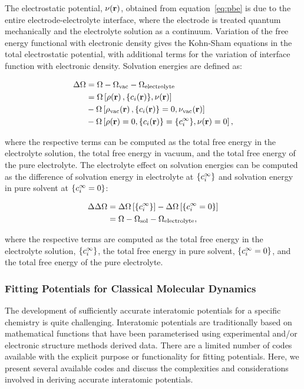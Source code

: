\documentclass[../main.tex]{subfiles}
\begin{document}
The electrostatic potential, $\nu\!\left(\mathbf{r}\right)$, obtained from equation~\ref{eq:pbe} is due to the entire electrode-electrolyte interface, where the electrode is treated quantum mechanically and the electrolyte solution as a continuum. Variation of the free energy functional with electronic density gives the Kohn-Sham equations in the total electrostatic potential, with additional terms for the variation of interface function with electronic density.\cite{Dziedzic2011, Ringe2016} Solvation energies are defined as:\cite{Ringe2016, Stein2019}

\begin{align}
    \Delta\Omega &=\Omega-\Omega_{\textrm{vac}}-\Omega_{\textrm{electrolyte}} \\
    &=\Omega\left[\rho\ofrvec,\{\ci\ofrvec\},\nu\ofrvec\right] \\
    \nonumber
    &-\Omega\left[\rho_{\textrm{vac}}\ofrvec,\{\ci\ofrvec\}=0,\nu_{\textrm{vac}}\ofrvec\right] \\
    \nonumber
    &-\Omega\left[\rho\ofrvec=0,\{\ci\ofrvec\}=\{\cif\},\nu\ofrvec=0\right]
    \nonumber,
\end{align}

where the respective terms can be computed as the total free energy in the electrolyte solution, the total free energy in vacuum, and the total free energy of the pure electrolyte.\cite{Dziedzic2020} The electrolyte effect on solvation energies can be computed as the difference of solvation energy in electrolyte at $\{c_i^{\infty}\}$ and solvation energy in pure solvent at $\{c_i^{\infty}=0\}$:

\begin{align}
    \Delta\Delta\Omega    &= \Delta\Omega\left[{\{c_i^{\infty}\}}\right]-\Delta\Omega\left[{\{c_i^{\infty}=0\}}\right] \\
    &= \Omega - \Omega_{\textrm{sol}} - \Omega_{\textrm{electrolyte}},
\end{align}

where the respective terms are computed as the total free energy in the electrolyte solution, $\{c_i^{\infty}\}$, the total free energy in pure solvent, $\{c_i^{\infty}=0\}$, and the total free energy of the pure electrolyte. 


\subsubsection{Fitting Potentials for Classical Molecular Dynamics}
\label{sec:potential_fitting}
The development of sufficiently accurate interatomic potentials for a specific chemistry is quite challenging. Interatomic potentials are traditionally based on mathematical functions that have been parameterised using experimental and/or electronic structure methods derived data. \cite{jones_1924, buckingham_classical_1938} There are a limited number of codes available with the explicit purpose or functionality for fitting potentials. Here, we present several available codes and discuss the complexities and considerations involved in deriving accurate interatomic potentials.
\end{document}
